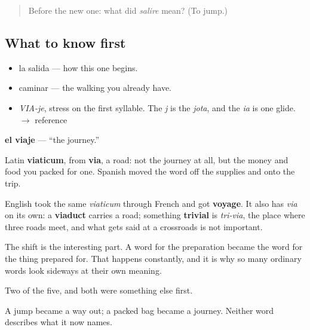 \label{lesson:ES-C288-viaje}



\begin{quote}
Before the new one: what did \emph{salire} mean? (To jump.)
\end{quote}

\subsection*{What to know first}
\begin{itemize}
\raggedright
  \item la salida — how this one begins.
  \item caminar — the walking you already have.
\end{itemize}

\begin{sounds}
\begin{itemize}
\raggedright
  \item \emph{VIA-je}, stress on the first syllable. The \emph{j} is the \emph{jota}, and the \emph{ia} is one glide. $\to$ reference
\end{itemize}
\end{sounds}

\begin{cousinweb}
\textbf{el viaje} — \textquotedblleft{}the journey.\textquotedblright{}

Latin \textbf{viaticum}, from \textbf{via}, a road: not the journey at all, but the money and food you packed for one. Spanish moved the word off the supplies and onto the trip.

English took the same \emph{viaticum} through French and got \textbf{voyage}. It also has \emph{via} on its own: a \textbf{viaduct} carries a road; something \textbf{trivial} is \emph{tri-via}, the place where three roads meet, and what gets said at a crossroads is not important.

The shift is the interesting part. A word for the preparation became the word for the thing prepared for. That happens constantly, and it is why so many ordinary words look sideways at their own meaning.
\end{cousinweb}

\begin{grammarlens}[title={What you've built}]
Two of the five, and both were something else first.

A jump became a way out; a packed bag became a journey. Neither word describes what it now names.
\end{grammarlens}

